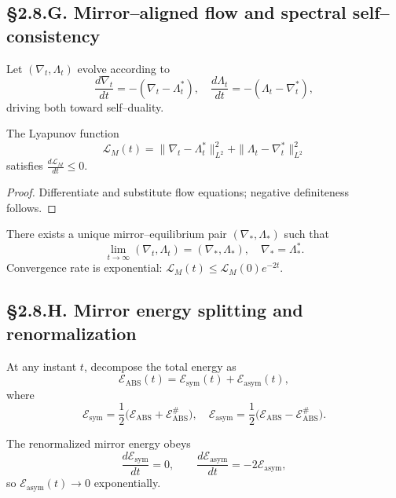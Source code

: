 \subsection*{§2.8.G. Mirror–aligned flow and spectral self–consistency}

\begin{definition}
Let $(\nabla_t,\Lambda_t)$ evolve according to
\[
\frac{d\nabla_t}{dt} = -(\nabla_t - \Lambda_t^\ast),\quad
\frac{d\Lambda_t}{dt} = -(\Lambda_t - \nabla_t^\ast),
\]
driving both toward self–duality.
\]
\end{definition}

\begin{lemma}
The Lyapunov function
\[
\mathcal{L}_M(t)=\|\nabla_t-\Lambda_t^\ast\|_{L^2}^2+\|\Lambda_t-\nabla_t^\ast\|_{L^2}^2
\]
satisfies $\frac{d\mathcal{L}_M}{dt}\le0$.
\end{lemma}

\begin{proof}
Differentiate and substitute flow equations; negative definiteness follows.
\end{proof}

\begin{theorem}\label{thm:2.8.exp}
There exists a unique mirror–equilibrium pair $(\nabla_\ast,\Lambda_\ast)$ such that
\[
\lim_{t\to\infty}(\nabla_t,\Lambda_t)=(\nabla_\ast,\Lambda_\ast),
\quad
\nabla_\ast=\Lambda_\ast^\ast.
\]
Convergence rate is exponential:
$\mathcal{L}_M(t)\le \mathcal{L}_M(0)e^{-2t}$.
\end{theorem}

\subsection*{§2.8.H. Mirror energy splitting and renormalization}

\begin{definition}
At any instant $t$, decompose the total energy as
\[
\mathcal{E}_{\mathrm{ABS}}(t)
=\mathcal{E}_{\mathrm{sym}}(t)+\mathcal{E}_{\mathrm{asym}}(t),
\]
where
\[
\mathcal{E}_{\mathrm{sym}}=\frac{1}{2}\big(\mathcal{E}_{\mathrm{ABS}}+\mathcal{E}_{\mathrm{ABS}}^\#\big),
\quad
\mathcal{E}_{\mathrm{asym}}=\frac{1}{2}\big(\mathcal{E}_{\mathrm{ABS}}-\mathcal{E}_{\mathrm{ABS}}^\#\big).
\]
\]
\end{definition}

\begin{theorem}\label{thm:2.8.ren}
The renormalized mirror energy obeys
\[
\frac{d\mathcal{E}_{\mathrm{sym}}}{dt} = 0, \qquad
\frac{d\mathcal{E}_{\mathrm{asym}}}{dt} = -2\mathcal{E}_{\mathrm{asym}},
\]
so $\mathcal{E}_{\mathrm{asym}}(t)\to0$ exponentially.
\end{theorem}

